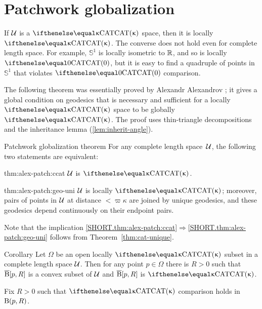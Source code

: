 
\section{Patchwork globalization}\label{sec:patchwork}

If $\mathcal{U}$ is a $\CAT\kappa$ space, then it is locally $\CAT\kappa$.
The converse does not hold even for complete length space.
For example, $\mathbb{S}^1$ is locally isometric to $\mathbb{R}$, and so
is locally $\CAT0$, but it is easy to find a quadruple of points in $\mathbb{S}^1$ that violates $\CAT0$ comparison.  

The following theorem was essentially proved by Alexandr Alexandrov \cite[Satz 9]{alexandrov:devel}; 
it gives a global condition on geodesics that is  necessary and sufficient for a locally $\CAT\kappa$ space to be globally $\CAT\kappa$. 
The proof uses thin-triangle decompositions 
and the inheritance lemma (\ref{lem:inherit-angle}). 

\begin{thm}{Patchwork globalization theorem}\label{thm:alex-patch}
For any complete length space~$\mathcal{U}$, the following two statements are equivalent:

\begin{subthm}{thm:alex-patch:ccat}
$\mathcal{U}$ is $\CAT\kappa$.
\end{subthm}
 
\begin{subthm}{thm:alex-patch:geo-uni}
$\mathcal{U}$ is locally $\CAT\kappa$; moreover,  pairs of points in $\mathcal{U}$ at distance $<\varpi\kappa$ are joined by unique geodesics, and these geodesics depend continuously on their endpoint pairs.
\end{subthm}

\end{thm}

Note that the implication \ref{SHORT.thm:alex-patch:ccat}$\Rightarrow$\ref{SHORT.thm:alex-patch:geo-uni} follows from Theorem~\ref{thm:cat-unique}.

\begin{thm}{Corollary}\label{cor:k-for-k}
Let $\Omega$ be an open locally $\CAT\kappa$ subset in a complete length  space $\mathcal{U}$. 
Then for any point $p\in \Omega$ there is $R>0$ such that $\overline{\mathrm{B}}{}[p,R]$ is a convex subset of $\mathcal{U}$ 
and $\overline{\mathrm{B}}{}[p,R]$ is $\CAT\kappa$.
\end{thm}

Fix $R>0$ such that $\CAT\kappa$ comparison holds in $\mathrm{B}{}(p,R)$.

